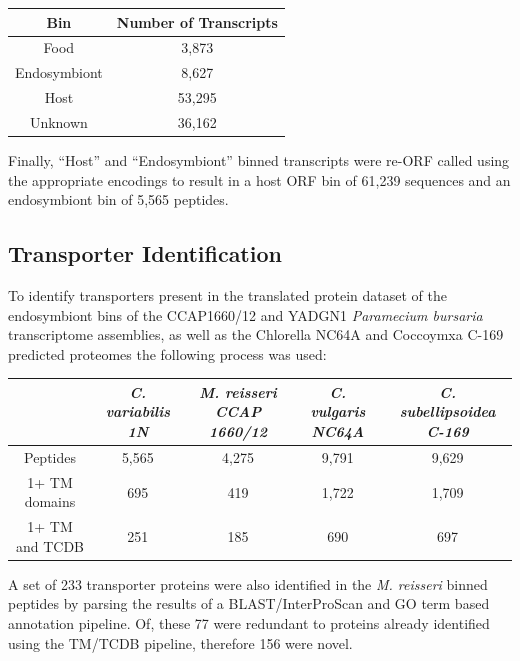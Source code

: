 \begin{table}
    \begin{tabular}{|c|c|}
        \hline
        \textbf{Bin} & \textbf{Number of Transcripts} \\
        \hline
        Food & 3,873 \\
        Endosymbiont & 8,627 \\
        Host & 53,295 \\
        Unknown & 36,162 \\
        \hline
    \end{tabular}
\end{table}

Finally, ``Host'' and ``Endosymbiont'' binned transcripts 
were re-ORF called using the appropriate encodings to result in a 
host ORF bin of 61,239 sequences
and an endosymbiont bin of 5,565 peptides. 

\subsection{Transporter Identification}

To identify transporters present in the translated protein dataset of the 
endosymbiont bins of the CCAP1660/12 and YADGN1 
\textit{Paramecium bursaria} transcriptome assemblies, as well as the Chlorella NC64A 
and Coccoymxa C-169 predicted proteomes the following process was used:

\begin{table}
    \begin{tabular}{|c|c|c|c|c|}
        \hline
        & \textit{C. variabilis 1N} & \textit{M. reisseri CCAP 1660/12} & \textit{C. vulgaris NC64A} & \textit{C. subellipsoidea C-169} \\
        \hline
        Peptides        & 5,565 & 4,275 & 9,791 & 9,629 \\
        1+ TM domains   & 695 & 419 & 1,722 & 1,709 \\
        1+ TM and TCDB  & 251 & 185 & 690 & 697 \\
        \hline
    \end{tabular}
\end{table}






A set of 233 
transporter proteins were also identified 
in the \textit{M. reisseri} binned peptides
by parsing the results of a 
BLAST/InterProScan and GO term based annotation pipeline.
Of, these 77 were redundant to proteins already identified using
the TM/TCDB pipeline, therefore 156 were novel.

